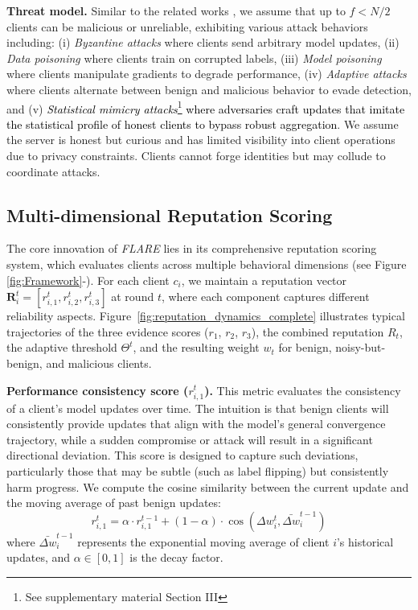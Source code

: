 \documentclass[lettersize,journal]{IEEEtran}
\newcommand*\circled[1]{\tikz[baseline=(char.base)]{
            \node[shape=circle,draw,inner sep=2pt] (char) {#1};}}
\begin{document}
\textbf{Threat model.} Similar to the related works \cite{zhao2024understandingbyzantinerobustnessfederated,yue2025advancinghybriddefensebyzantine,deshmukh2024byzantinerobustfederatedlearningoverview,syros2025droppoisondilutionknowledge,xie2025modelpoisoningattacksfederated}, we assume that up to $f < N/2$ clients can be malicious or unreliable, exhibiting various attack behaviors including: (i) \textit{Byzantine attacks} where clients send arbitrary model updates, (ii) \textit{Data poisoning} where clients train on corrupted labels, (iii) \textit{Model poisoning} where clients manipulate gradients to degrade performance, (iv) \textit{Adaptive attacks} where clients alternate between benign and malicious behavior to evade detection, and (v) \textcolor{black}{\textit{Statistical mimicry attacks}\footnote{See supplementary material Section III} where adversaries craft updates that imitate the statistical profile of honest clients to bypass robust aggregation}. We assume the server is honest but curious \cite{10184496} and has limited visibility into client operations due to privacy constraints. Clients cannot forge identities but may collude to coordinate attacks.


\subsection{Multi-dimensional Reputation Scoring}\label{ssub:Multi-dimensional Reputation Scoring}
The core innovation of \textit{FLARE} lies in its comprehensive reputation scoring system, which evaluates clients across multiple behavioral dimensions (see Figure \ref{fig:Framework}-\circled{1}). For each client $c_i$, we maintain a reputation vector $\mathbf{R}_i^t = [r_{i,1}^t, r_{i,2}^t, r_{i,3}^t]$ at round $t$, where each component captures different reliability aspects. Figure~\ref{fig:reputation_dynamics_complete} illustrates typical trajectories of the three evidence scores ($r_1$, $r_2$, $r_3$), the combined reputation $R_t$, the adaptive threshold $\Theta^t$, and the resulting weight $w_t$ for benign, noisy-but-benign, and malicious clients.

\textbf{Performance consistency score ($r_{i,1}^t$).}
This metric evaluates the consistency of a client's model updates over time. The intuition is that benign clients will consistently provide updates that align with the model's general convergence trajectory, while a sudden compromise or attack will result in a significant directional deviation. This score is designed to capture such deviations, particularly those that may be subtle (such as label flipping) but consistently harm progress. We compute the cosine similarity between the current update and the moving average of past benign updates:
\begin{equation}\label{eq:Performance consistency score}
r_{i,1}^t = \alpha \cdot r_{i,1}^{t-1} + (1-\alpha) \cdot \cos(\Delta w_i^t, \bar{\Delta w}_i^{t-1})
\end{equation}
where $\bar{\Delta w}_i^{t-1}$ represents the exponential moving average of client $i$'s historical updates, and $\alpha \in [0,1]$ is the decay factor.
\end{document}
